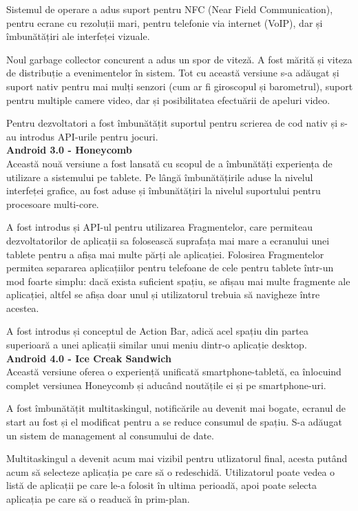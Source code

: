 \documentclass[12pt,a4paper]{article}
\begin{document}
	Sistemul de operare a adus suport pentru NFC (Near Field Communication), pentru ecrane cu rezoluții mari, pentru telefonie via internet (VoIP), dar și îmbunătățiri ale interfeței vizuale.

	Noul garbage collector concurent a adus un spor de viteză. A fost mărită și viteza de distribuție a evenimentelor în sistem. Tot cu această versiune s-a adăugat și suport nativ pentru mai mulți senzori (cum ar fi giroscopul și barometrul), suport pentru multiple camere video, dar și posibilitatea efectuării de apeluri video.

	Pentru dezvoltatori a fost îmbunătățit suportul pentru scrierea de cod nativ și s-au introdus API-urile pentru jocuri.\\

\textbf{Android 3.0 - Honeycomb}\\
Această nouă versiune a fost lansată cu scopul de a îmbunătăți experiența de utilizare a sistemului pe tablete. Pe lângă îmbunătățirile aduse la nivelul interfeței grafice, au fost aduse și îmbunătățiri la nivelul suportului pentru procesoare multi-core.

	A fost introdus și API-ul pentru utilizarea Fragmentelor, care permiteau dezvoltatorilor de aplicații sa folosească suprafața mai mare a ecranului unei tablete pentru a afișa mai multe părți ale aplicației. Folosirea Fragmentelor permitea separarea aplicațiilor pentru telefoane de cele pentru tablete într-un mod foarte simplu: dacă exista suficient spațiu, se afișau mai multe fragmente ale aplicației, altfel se afișa doar unul și utilizatorul trebuia să navigheze între acestea.

	A fost introdus și conceptul de Action Bar, adică acel spațiu din partea superioară a unei aplicații similar unui meniu dintr-o aplicație desktop.\\

\textbf{Android 4.0 - Ice Creak Sandwich}\\
Această versiune oferea o experiență unificată smartphone-tabletă, ea înlocuind complet versiunea Honeycomb și aducând noutățile ei și pe smartphone-uri.

	A fost îmbunătățit multitaskingul, notificările au devenit mai bogate, ecranul de start au fost și el modificat pentru a se reduce consumul de spațiu. S-a adăugat un sistem de management al consumului de date.

	Multitaskingul a devenit acum mai vizibil pentru utlizatorul final, acesta putând acum să selecteze aplicația pe care să o redeschidă. Utilizatorul poate vedea o listă de aplicații pe care le-a folosit în ultima perioadă, apoi poate selecta aplicația pe care să o readucă în prim-plan.
\end{document}
